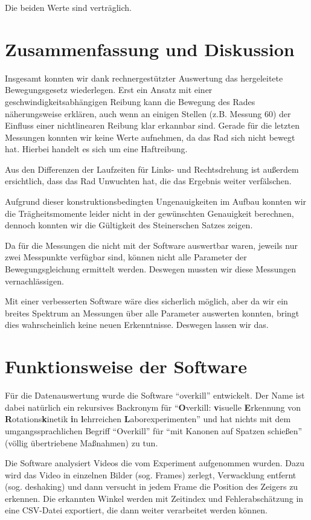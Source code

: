 \documentclass[a4paper,german,12pt,smallheadings]{scrartcl}
\begin{document}
Die beiden Werte sind verträglich.

\section{Zusammenfassung und Diskussion}
Insgesamt konnten wir dank rechnergestützter Auswertung das hergeleitete
Bewegungsgesetz wiederlegen. Erst ein Ansatz mit einer
geschwindigkeitsabhängigen Reibung kann die Bewegung des Rades näherungsweise
erklären, auch wenn an einigen Stellen (z.B. Messung 60) der Einfluss einer
nichtlinearen Reibung klar erkannbar sind. Gerade für die letzten Messungen
konnten wir keine Werte aufnehmen, da das Rad sich nicht bewegt hat. Hierbei
handelt es sich um eine Haftreibung.

Aus den Differenzen der Laufzeiten für Links- und Rechtsdrehung ist außerdem
ersichtlich, dass das Rad Unwuchten hat, die das Ergebnis weiter verfälschen.

Aufgrund dieser konstruktionsbedingten Ungenauigkeiten im Aufbau konnten wir
die Trägheitsmomente leider nicht in der gewünschten Genauigkeit berechnen,
dennoch konnten wir die Gültigkeit des Steinerschen Satzes zeigen.


Da für die Messungen die nicht mit der Software auswertbar waren, jeweils nur
zwei Messpunkte verfügbar sind, können nicht alle Parameter der
Bewegungsgleichung ermittelt werden. Deswegen mussten wir diese Messungen
vernachlässigen.

Mit einer verbesserten Software wäre dies sicherlich möglich, aber da wir ein
breites Spektrum an Messungen über alle Parameter auswerten konnten, bringt
dies wahrscheinlich keine neuen Erkenntnisse. Deswegen lassen wir das.

\section{Funktionsweise der Software}
Für die Datenauswertung wurde die Software ``overkill'' entwickelt. Der Name
ist dabei natürlich ein rekursives Backronym für ``\textbf{O}verkill:
\textbf{v}isuelle \textbf{E}rkennung von \textbf{R}otations\textbf{k}inetik
\textbf{i}n \textbf{l}ehrreichen \textbf{L}aborexperimenten'' und hat nichts mit dem
umgangssprachlichen Begriff ``Overkill'' für ``mit Kanonen auf Spatzen
schießen'' (völlig übertriebene Maßnahmen) zu tun.

Die Software analysiert Videos die vom Experiment aufgenommen wurden. Dazu wird
das Video in einzelnen Bilder (sog. Frames) zerlegt, Verwacklung entfernt (sog.
deshaking) und dann versucht in jedem Frame die Position des Zeigers zu
erkennen. Die erkannten Winkel werden mit Zeitindex und Fehlerabschätzung in
eine CSV-Datei exportiert, die dann weiter verarbeitet werden können.
\end{document}
